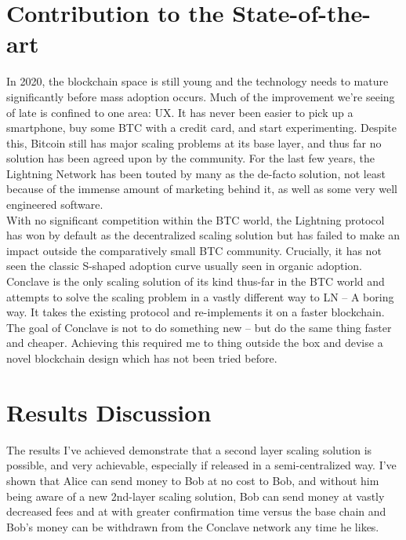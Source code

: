\documentclass{report}
\begin{document}
	\section{Contribution to the State-of-the-art}
	In 2020, the blockchain space is still young and the technology needs to mature significantly before mass adoption occurs. Much of the improvement we’re seeing of late is confined to one area: UX. It has never been easier to pick up a smartphone, buy some BTC with a credit card, and start experimenting. Despite this, Bitcoin still has major scaling problems at its base layer, and thus far no solution has been agreed upon by the community. For the last few years, the Lightning Network has been touted by many as the de-facto solution, not least because of the immense amount of marketing behind it, as well as some very well engineered software. \\

With no significant competition within the BTC world, the Lightning protocol has won by default as the decentralized scaling solution but has failed to make an impact outside the comparatively small BTC community. Crucially, it has not seen the classic S-shaped adoption curve usually seen in organic adoption. \\

Conclave is the only scaling solution of its kind thus-far in the BTC world and attempts to solve the scaling problem in a vastly different way to LN – A boring way. It takes the existing protocol and re-implements it on a faster blockchain. The goal of Conclave is not to do something new – but do the same thing faster and cheaper. Achieving this required me to thing outside the box and devise a novel blockchain design which has not been tried before. \\

	\section{Results Discussion}
	The results I've achieved demonstrate that a second layer scaling solution is possible, and very achievable, especially if released in a semi-centralized way. I've shown that Alice can send money to Bob at no cost to Bob, and without him being aware of a new 2nd-layer scaling solution, Bob can send money at vastly decreased fees and at with greater confirmation time versus the base chain and Bob's money can be withdrawn from the Conclave network any time he likes. \\
	
\end{document}
